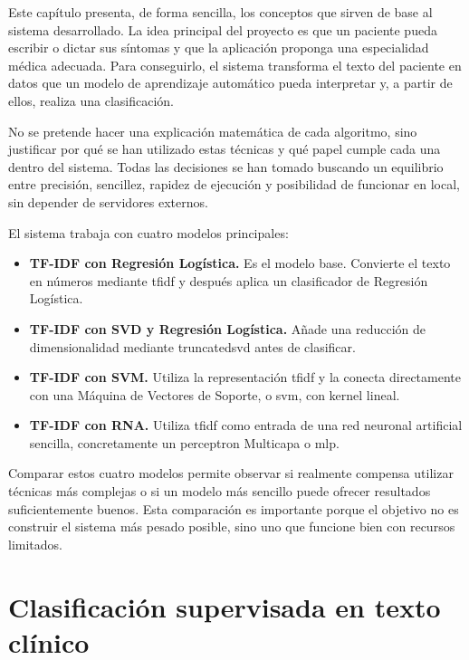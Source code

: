 
Este capítulo presenta, de forma sencilla, los conceptos que sirven de base al sistema desarrollado. La idea principal del proyecto es que un paciente pueda escribir o dictar sus síntomas y que la aplicación proponga una especialidad médica adecuada. Para conseguirlo, el sistema transforma el texto del paciente en datos que un modelo de aprendizaje automático pueda interpretar y, a partir de ellos, realiza una clasificación.

No se pretende hacer una explicación matemática de cada algoritmo, sino justificar por qué se han utilizado estas técnicas y qué papel cumple cada una dentro del sistema. Todas las decisiones se han tomado buscando un equilibrio entre precisión, sencillez, rapidez de ejecución y posibilidad de funcionar en local, sin depender de servidores externos.

El sistema trabaja con cuatro modelos principales:

\begin{itemize}
	\item \textbf{TF-IDF con Regresión Logística.} Es el modelo base. Convierte el texto en números mediante \gls{tfidf} y después aplica un clasificador de Regresión Logística.
	
	\item \textbf{TF-IDF con SVD y Regresión Logística.} Añade una reducción de dimensionalidad mediante \gls{truncatedsvd} antes de clasificar.
	
	\item \textbf{TF-IDF con SVM.} Utiliza la representación \gls{tfidf} y la conecta directamente con una Máquina de Vectores de Soporte, o \gls{svm}, con kernel lineal.
	
	\item \textbf{TF-IDF con RNA.} Utiliza \gls{tfidf} como entrada de una red neuronal artificial sencilla, concretamente un \gls{perceptron} Multicapa o \gls{mlp}.
\end{itemize}

Comparar estos cuatro modelos permite observar si realmente compensa utilizar técnicas más complejas o si un modelo más sencillo puede ofrecer resultados suficientemente buenos. Esta comparación es importante porque el objetivo no es construir el sistema más pesado posible, sino uno que funcione bien con recursos limitados.

\section{Clasificación supervisada en texto clínico}

